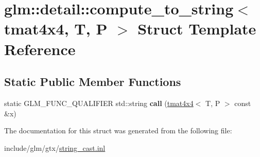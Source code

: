 \hypertarget{structglm_1_1detail_1_1compute__to__string_3_01tmat4x4_00_01T_00_01P_01_4}{}\section{glm\+:\+:detail\+:\+:compute\+\_\+to\+\_\+string$<$ tmat4x4, T, P $>$ Struct Template Reference}
\label{structglm_1_1detail_1_1compute__to__string_3_01tmat4x4_00_01T_00_01P_01_4}
\subsection*{Static Public Member Functions}
\begin{DoxyCompactItemize}
\item 
\mbox{\label{structglm_1_1detail_1_1compute__to__string_3_01tmat4x4_00_01T_00_01P_01_4_ac6e1968f8240ac2d9644216a7922bab2}} 
static G\+L\+M\+\_\+\+F\+U\+N\+C\+\_\+\+Q\+U\+A\+L\+I\+F\+I\+ER std\+::string {\bfseries call} (\hyperlink{structglm_1_1tmat4x4}{tmat4x4}$<$ T, P $>$ const \&x)
\end{DoxyCompactItemize}


The documentation for this struct was generated from the following file\+:\begin{DoxyCompactItemize}
\item 
include/glm/gtx/\hyperlink{string__cast_8inl}{string\+\_\+cast.\+inl}\end{DoxyCompactItemize}
